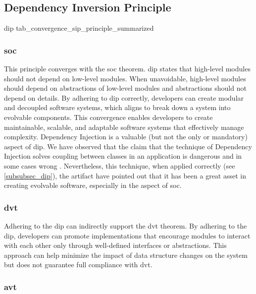 \subsection{Dependency Inversion Principle}

\compareTable
{\acrlong*{dip}}
{tab_convergence_sip_principle_summarized}
{\addEvalRow{\fullAlignment & \partialAlignment & \partialAlignment & \noAlignment}}

\subsubsection{\acrlong*{soc}}

This principle converges with the \gls{soc} theorem. \gls{dip} states that high-level
modules should not depend on low-level modules. When unavoidable, high-level modules
should depend on abstractions of low-level modules and abstractions should not depend on
details. By adhering to \gls{dip} correctly, developers can create modular and decoupled
software systems, which aligns to break down a system into evolvable components. This
convergence enables developers to create maintainable, scalable, and adaptable software
systems that effectively manage complexity. Dependency Injection is a valuable (but not
the only or mandatory) aspect of \gls{dip}. We have observed that the claim that the
technique of Dependency Injection solves coupling between classes in an application is
dangerous and in some cases wrong \parencite[215]{mannaert_normalized_2016}. Nevertheless,
this technique, when applied correctly (see \ref{subsubsec_dip}), the artifact have
pointed out that it has been a great asset in creating evolvable software, especially in
the aspect of \gls{soc}.

\subsubsection{\acrlong*{dvt}} 

Adhering to the \gls{dip} can indirectly support the \gls{dvt} theorem. By adhering to the
\gls{dip}, developers can promote implementations that encourage modules to interact with
each other only through well-defined interfaces or abstractions. This approach can help
minimize the impact of data structure changes on the system but does not guarantee full
compliance with \gls{dvt}.

\subsubsection{\acrlong*{avt}}

